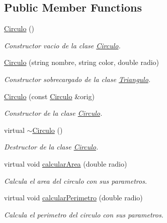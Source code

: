 \subsection*{Public Member Functions}
\begin{DoxyCompactItemize}
\item 
\hypertarget{class_circulo_a6933bf908b78a4167684081a3a8f257f}{}\label{class_circulo_a6933bf908b78a4167684081a3a8f257f} 
\hyperlink{class_circulo_a6933bf908b78a4167684081a3a8f257f}{Circulo} ()
\begin{DoxyCompactList}\small\item\em Constructor vacio de la clase \hyperlink{class_circulo}{Circulo}. \end{DoxyCompactList}\item 
\hyperlink{class_circulo_a14db1f1a04f7adfa9f3e785fce82419c}{Circulo} (string nombre, string color, double radio)
\begin{DoxyCompactList}\small\item\em Constructor sobrecargado de la clase \hyperlink{class_triangulo}{Triangulo}. \end{DoxyCompactList}\item 
\hyperlink{class_circulo_aa1ceac8b166daa79997baa338d6e37e5}{Circulo} (const \hyperlink{class_circulo}{Circulo} \&orig)
\begin{DoxyCompactList}\small\item\em Constructor de la clase \hyperlink{class_circulo}{Circulo}. \end{DoxyCompactList}\item 
\hypertarget{class_circulo_a8efe39e0e89487519cd802f0738d3bf4}{}\label{class_circulo_a8efe39e0e89487519cd802f0738d3bf4} 
virtual \hyperlink{class_circulo_a8efe39e0e89487519cd802f0738d3bf4}{$\sim$\+Circulo} ()
\begin{DoxyCompactList}\small\item\em Destructor de la clase \hyperlink{class_circulo}{Circulo}. \end{DoxyCompactList}\item 
virtual void \hyperlink{class_circulo_a98d2107db46b9f7aacf47a6500a154d5}{calcular\+Area} (double radio)
\begin{DoxyCompactList}\small\item\em Calcula el area del circulo con sus parametros. \end{DoxyCompactList}\item 
virtual void \hyperlink{class_circulo_a4b621679f004d4a093cb18b676079a01}{calcular\+Perimetro} (double radio)
\begin{DoxyCompactList}\small\item\em Calcula el perimetro del circulo con sus parametros. \end{DoxyCompactList}\item 

\end{DoxyCompactItemize}
